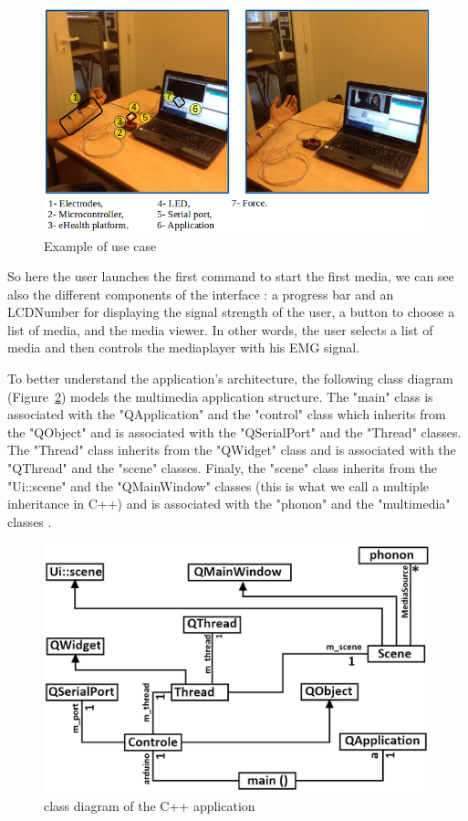 \documentclass[conference]{IEEEtran}
\begin{document}
\begin{figure}[!hb]
    \includegraphics[scale=0.30]{app2.png}
    \caption{Example of use case}
    \label{fig:example}
\end{figure}

So here the user launches the first command to start the first media, we can see also the different components of the interface : a progress bar and an LCDNumber for displaying the signal strength of the user, a button to choose a list of media, and the media viewer. In other words, the user selects a list of media and then controls the mediaplayer with his EMG signal.
\par
To better understand the application's architecture, the following class diagram (Figure~\ref{fig:diagram}) models the multimedia application structure. The "main" class is associated with the "QApplication" and the "control" class which inherits from the "QObject" and is associated with the "QSerialPort" and the "Thread" classes. The "Thread" class inherits from the "QWidget" class and is associated with the "QThread" and the "scene" classes. Finaly, the "scene" class inherits from the "Ui::scene" and the "QMainWindow" classes (this is what we call a multiple inheritance in C++) and is associated with the "phonon" and the "multimedia" classes .

\begin{figure}[!hb]
    \includegraphics[scale=0.30]{app3.png}
    \caption{class diagram of the C++ application}
    \label{fig:diagram}
\end{figure}
\end{document}
